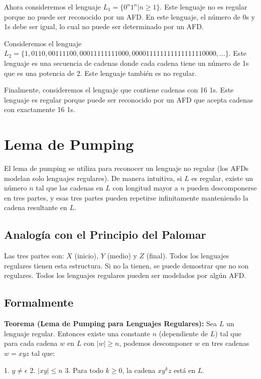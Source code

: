 \documentclass[11pt]{article}
\begin{document}
    Ahora consideremos el lenguaje $L_1 = \{0^n1^n | n \geq 1\}$. Este lenguaje no es regular porque no puede ser reconocido por un AFD. En este lenguaje, el número de 0s y 1s debe ser igual, lo cual no puede ser determinado por un AFD.

    Consideremos el lenguaje $L_2 = \{1, 0110, 00111100, 00011111111000, 000011111111111111110000, \ldots\}$. Este lenguaje es una secuencia de cadenas donde cada cadena tiene un número de 1s que es una potencia de 2. Este lenguaje también es no regular.

    Finalmente, consideremos el lenguaje que contiene cadenas con 16 1s. Este lenguaje es regular porque puede ser reconocido por un AFD que acepta cadenas con exactamente 16 1s.


    \section{Lema de Pumping}

    El lema de pumping se utiliza para reconocer un lenguaje no regular (los AFDs modelan solo lenguajes regulares). De manera intuitiva, si $L$ es regular, existe un número $n$ tal que las cadenas en $L$ con longitud mayor a $n$ pueden descomponerse en tres partes, y esas tres partes pueden repetirse infinitamente manteniendo la cadena resultante en $L$.

    \subsection{Analogía con el Principio del Palomar}

    Las tres partes son: $X$ (inicio), $Y$ (medio) y $Z$ (final). Todos los lenguajes regulares tienen esta estructura. Si no la tienen, se puede demostrar que no son regulares. Todos los lenguajes regulares pueden ser modelados por algún AFD.

    \subsection{Formalmente}

    \textbf{Teorema (Lema de Pumping para Lenguajes Regulares):} Sea $L$ un lenguaje regular. Entonces existe una constante $n$ (dependiente de $L$) tal que para cada cadena $w$ en $L$ con $|w| \geq n$, podemos descomponer $w$ en tres cadenas $w = xyz$ tal que:

    1. $y \neq \epsilon$
    2. $|xy| \leq n$
    3. Para todo $k \geq 0$, la cadena $xy^kz$ está en $L$.
\end{document}
